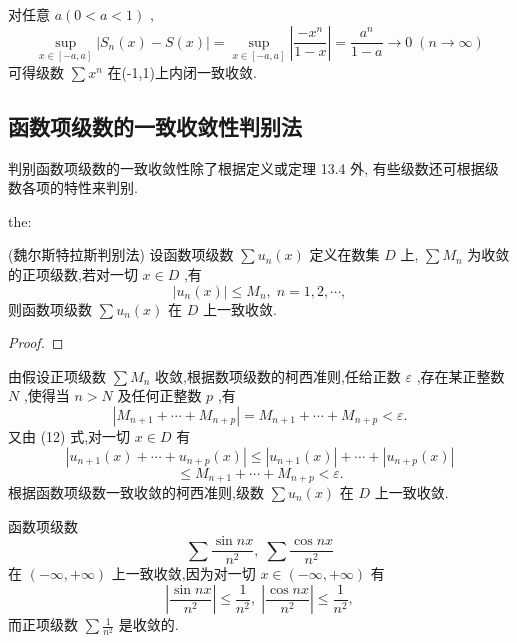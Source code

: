 对任意 \(a\left( {0 < a < 1}\right)\) ,
\[
\mathop{\sup }\limits_{{x \in  \left\lbrack  {-a,a}\right\rbrack  }}\left| {{S}_{n}\left( x\right)  - S\left( x\right) }\right|  = \mathop{\sup }\limits_{{x \in  \left\lbrack  {-a,a}\right\rbrack  }}\left| \frac{-{x}^{n}}{1 - x}\right|  = \frac{{a}^{n}}{1 - a} \rightarrow  0\;\left( {n \rightarrow  \infty }\right)
\]
可得级数 \(\sum {x}^{n}\) 在(-1,1)上内闭一致收敛.

\subsection{函数项级数的一致收敛性判别法}

判别函数项级数的一致收敛性除了根据定义或定理 13.4 外, 有些级数还可根据级数各项的特性来判别.

\begin{theorem}{}{the:}

\end{theorem}
 (魏尔斯特拉斯判别法) 设函数项级数 \(\sum {u}_{n}\left( x\right)\) 定义在数集 \(D\) 上, \(\sum {M}_{n}\) 为收敛的正项级数,若对一切 \(x \in  D\) ,有
\[
\left| {{u}_{n}\left( x\right) }\right|  \leq  {M}_{n},\;n = 1,2,\cdots , \tag{12}
\]
则函数项级数 \(\sum {u}_{n}\left( x\right)\) 在 \(D\) 上一致收敛.

\begin{proof}

\end{proof}
由假设正项级数 \(\sum {M}_{n}\) 收敛,根据数项级数的柯西准则,任给正数 \(\varepsilon\) ,存在某正整数 \(N\) ,使得当 \(n > N\) 及任何正整数 \(p\) ,有
\[
\left| {{M}_{n + 1} + \cdots  + {M}_{n + p}}\right|  = {M}_{n + 1} + \cdots  + {M}_{n + p} < \varepsilon .
\]
又由 (12) 式,对一切 \(x \in  D\) 有
\[
\left| {{u}_{n + 1}\left( x\right)  + \cdots  + {u}_{n + p}\left( x\right) }\right|  \leq  \left| {{u}_{n + 1}\left( x\right) }\right|  + \cdots  + \left| {{u}_{n + p}\left( x\right) }\right|
\]
\[
\leq  {M}_{n + 1} + \cdots  + {M}_{n + p} < \varepsilon .
\]
根据函数项级数一致收敛的柯西准则,级数 \(\sum {u}_{n}\left( x\right)\) 在 \(D\) 上一致收敛.

\begin{example}

\end{example}
函数项级数
\[
\sum \frac{\sin {nx}}{{n}^{2}},\;\sum \frac{\cos {nx}}{{n}^{2}}
\]
在 \(\left( {-\infty , + \infty }\right)\) 上一致收敛,因为对一切 \(x \in  \left( {-\infty , + \infty }\right)\) 有
\[
\left| \frac{\sin {nx}}{{n}^{2}}\right|  \leq  \frac{1}{{n}^{2}},\;\left| \frac{\cos {nx}}{{n}^{2}}\right|  \leq  \frac{1}{{n}^{2}},
\]
而正项级数 \(\sum \frac{1}{{n}^{2}}\) 是收敛的.

